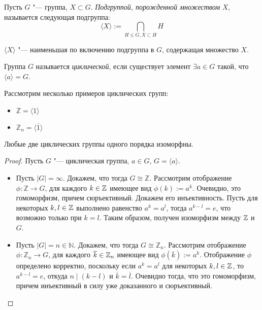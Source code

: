     \begin{definition}
    	Пусть $G$ "--- группа, $X \subset G$. \textit{Подгруппой, порожденной множеством} $X$, называется следующая подгруппа:
    	\[\langle X\rangle := \bigcap_{H \le G, X \subset H}H\]
    \end{definition}
    
    \begin{note}
    	$\langle X\rangle$ "--- наименьшая по включению подгруппа в $G$, содержащая множество $X$.
    \end{note}
    
    \begin{definition}
    	Группа $G$ называется \textit{циклической}, если существует элемент $\exists a \in G$ такой, что $\langle a\rangle = G$.
    \end{definition}
    
    \begin{example}
    	Рассмотрим несколько примеров циклических групп:
    	\begin{itemize}
    		\item $\mathbb{Z} = \langle 1 \rangle$
    		\item $\mathbb{Z}_n = \langle \overline{1} \rangle$
    	\end{itemize}
    \end{example}
    
    \begin{theorem}
    	Любые две циклических группы одного порядка изоморфны.
    \end{theorem}
    
    \begin{proof}
    	Пусть $G$ "--- циклическая группа, $a \in G$, $G = \langle a\rangle$.
    	
    	\begin{itemize}
    		\item Пусть $|G| = \infty$. Докажем, что тогда $G \cong \mathbb{Z}$. Рассмотрим отображение $\phi: \mathbb{Z} \rightarrow G$, для каждого $k \in \mathbb{Z}$ имеющее вид $\phi(k) := a^k$. Очевидно, это гомоморфизм, причем сюръективный. Докажем его инъективность. Пусть для некоторых $k, l \in \mathbb{Z}$ выполнено равенство $a^k = a^l$, тогда $a^{k - l} = e$, что возможно только при $k = l$. Таким образом, получен изоморфизм между $\mathbb{Z}$ и $G$.
    		
    		\item Пусть $|G| = n \in \mathbb{N}$. Докажем, что тогда $G \cong \mathbb{Z}_n$. Рассмотрим отображение $\phi: \mathbb{Z}_n \rightarrow G$, для каждого $\overline{k} \in \mathbb{Z}_n$ имеющее вид $\phi(\overline{k}) := a^k$. Отображение $\phi$ определено корректно, поскольку если $a^k = a^l$ для некоторых $k, l \in \mathbb{Z}$, то $a^{k - l} = e$, откуда $n \mid (k - l)$ и $\overline{k} = \overline{l}$. Очевидно тогда, что это гомоморфизм, причем инъективный в силу уже доказанного и сюръективный.\qedhere
    	\end{itemize}
    \end{proof}
    
